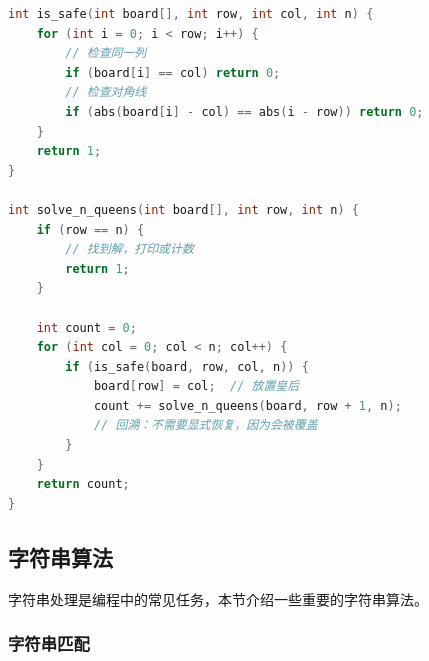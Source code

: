 \begin{lstlisting}[language=C, caption={N 皇后问题回溯解法}]
int is_safe(int board[], int row, int col, int n) {
    for (int i = 0; i < row; i++) {
        // 检查同一列
        if (board[i] == col) return 0;
        // 检查对角线
        if (abs(board[i] - col) == abs(i - row)) return 0;
    }
    return 1;
}

int solve_n_queens(int board[], int row, int n) {
    if (row == n) {
        // 找到解，打印或计数
        return 1;
    }

    int count = 0;
    for (int col = 0; col < n; col++) {
        if (is_safe(board, row, col, n)) {
            board[row] = col;  // 放置皇后
            count += solve_n_queens(board, row + 1, n);
            // 回溯：不需要显式恢复，因为会被覆盖
        }
    }
    return count;
}
\end{lstlisting}

\subsection{字符串算法}

字符串处理是编程中的常见任务，本节介绍一些重要的字符串算法。

\subsubsection{字符串匹配}

